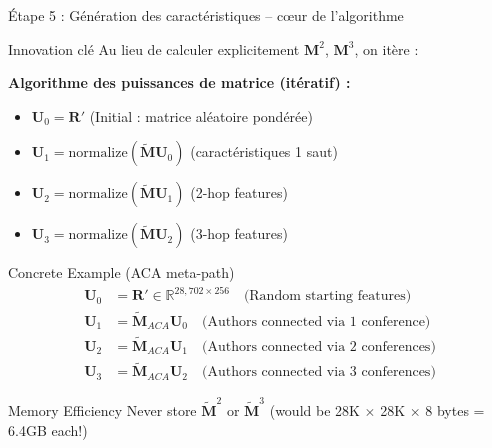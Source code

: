 \documentclass[9pt,aspectratio=169,professionalfonts]{beamer}
\begin{document}
\begin{frame}{Étape 5 : Génération des caractéristiques – cœur de l'algorithme}
\begin{block}{Innovation clé}
Au lieu de calculer explicitement $\mathbf{M}^2$, $\mathbf{M}^3$, on itère :
\end{block}

\textbf{Algorithme des puissances de matrice (itératif) :}
\begin{itemize}
    \item $\mathbf{U}_0 = \mathbf{R}'$ \quad (Initial : matrice aléatoire pondérée)
    \item $\mathbf{U}_1 = \text{normalize}(\tilde{\mathbf{M}} \mathbf{U}_0)$ \quad (caractéristiques 1 saut)
    \item $\mathbf{U}_2 = \text{normalize}(\tilde{\mathbf{M}} \mathbf{U}_1)$ \quad (2-hop features)  
    \item $\mathbf{U}_3 = \text{normalize}(\tilde{\mathbf{M}} \mathbf{U}_2)$ \quad (3-hop features)
\end{itemize}

\begin{exampleblock}{Concrete Example (ACA meta-path)}
\begin{align*}
\mathbf{U}_0 &= \mathbf{R}' \in \mathbb{R}^{28,702 \times 256} \quad \text{(Random starting features)} \\
\mathbf{U}_1 &= \tilde{\mathbf{M}}_{ACA} \mathbf{U}_0 \quad \text{(Authors connected via 1 conference)} \\
\mathbf{U}_2 &= \tilde{\mathbf{M}}_{ACA} \mathbf{U}_1 \quad \text{(Authors connected via 2 conferences)} \\
\mathbf{U}_3 &= \tilde{\mathbf{M}}_{ACA} \mathbf{U}_2 \quad \text{(Authors connected via 3 conferences)}
\end{align*}
\end{exampleblock}

\begin{alertblock}{Memory Efficiency}
Never store $\tilde{\mathbf{M}}^2$ or $\tilde{\mathbf{M}}^3$ (would be 28K $\times$ 28K $\times$ 8 bytes = 6.4GB each!)
\end{alertblock}
\end{frame}
\end{document}
